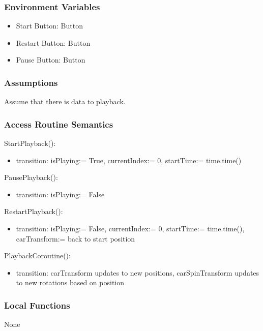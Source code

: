 \documentclass[12pt, titlepage]{article}
\begin{document}
\subsubsection{Environment Variables}

\begin{itemize}
  \item Start Button: Button
  \item Restart Button: Button
  \item Pause Button: Button
\end{itemize}

\subsubsection{Assumptions}

Assume that there is data to playback.
\subsubsection{Access Routine Semantics}

\noindent StartPlayback():
\begin{itemize}
\item transition: isPlaying:= True, currentIndex:= 0, startTime:= time.time()
\end{itemize}

\noindent PausePlayback():
\begin{itemize}
\item transition: isPlaying:= False
\end{itemize}

\noindent RestartPlayback():
\begin{itemize}
\item transition: isPlaying:= False, currentIndex:= 0, startTime:= time.time(), carTransform:= back to start position
\end{itemize}

\noindent PlaybackCoroutine():
\begin{itemize}
\item transition: carTransform updates to new positions, carSpinTransform updates to new rotations based on position
\end{itemize}

\subsubsection{Local Functions}

None
\end{document}
